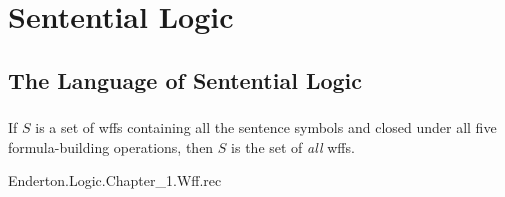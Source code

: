 \documentclass{report}
\begin{document}
\chapter{Sentential Logic}%

\section{The Language of Sentential Logic}%

\subsection{}%

  \begin{theorem}
    If $S$ is a set of wffs containing all the sentence symbols and closed under
      all five formula-building operations, then $S$ is the set of \textit{all}
      wffs.
  \end{theorem}

    {Enderton.Logic.Chapter\_1.Wff.rec}
\end{document}
